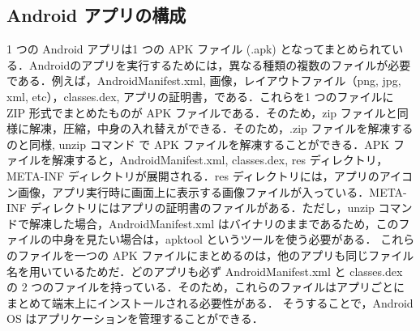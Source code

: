 \subsection{Android アプリの構成}
\label{sec:andrapp}
1 つの Android アプリは1 つの APK ファイル (.apk) となってまとめられている．Androidのアプリを実行するためには，異なる種類の複数のファイルが必要である．例えば，AndroidManifest.xml, 画像，レイアウトファイル（png, jpg, xml, etc），classes.dex, アプリの証明書，である．これらを1 つのファイルに ZIP 形式でまとめたものが APK ファイルである．そのため，zip ファイルと同様に解凍，圧縮，中身の入れ替えができる．そのため，.zip ファイルを解凍するのと同様, unzip コマンド で APK ファイルを解凍することができる．APK ファイルを解凍すると，AndroidManifest.xml, classes.dex, res ディレクトリ，META-INF ディレクトリが展開される．res ディレクトリには，アプリのアイコン画像，アプリ実行時に画面上に表示する画像ファイルが入っている．META-INF ディレクトリにはアプリの証明書のファイルがある．ただし，unzip コマンドで解凍した場合，AndroidManifest.xml はバイナリのままであるため，このファイルの中身を見たい場合は，apktool \cite{apktool} というツールを使う必要がある．
これらのファイルを一つの APK ファイルにまとめるのは，他のアプリも同じファイル名を用いているためだ．どのアプリも必ず AndroidManifest.xml と classes.dex の 2 つのファイルを持っている．そのため，これらのファイルはアプリごとにまとめて端末上にインストールされる必要性がある． そうすることで，Android OS はアプリケーションを管理することができる．

